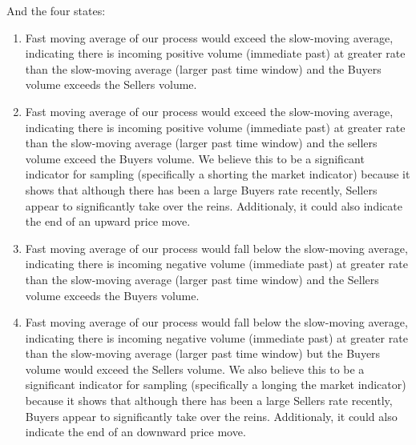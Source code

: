 And the four states:
\begin{enumerate}
\item Fast moving average of our process would exceed the slow-moving average, indicating there is incoming positive volume (immediate past) at greater rate than the slow-moving average (larger past time window) and the Buyers volume exceeds the Sellers volume.
\item Fast moving average of our process would exceed the slow-moving average, indicating there is incoming positive volume (immediate past) at greater rate than the slow-moving average (larger past time window) and the sellers volume exceed the Buyers volume. We believe this to be a significant indicator for sampling (specifically a shorting the market indicator) because it shows that although there has been a large Buyers rate recently, Sellers appear to significantly take over the reins. Additionaly, it could also indicate the end of an upward price move.
\item Fast moving average of our process would fall below the slow-moving average, indicating there is incoming negative volume (immediate past) at greater rate than the slow-moving average (larger past time window) and the Sellers volume exceeds the Buyers volume.
\item Fast moving average of our process would fall below the slow-moving average, indicating there is incoming negative volume (immediate past) at greater rate than the slow-moving average (larger past time window) but the Buyers volume would exceed the Sellers volume. We also believe this to be a significant indicator for sampling (specifically a longing the market indicator) because it shows that although there has been a large Sellers rate recently, Buyers appear to significantly take over the reins. Additionaly, it could also indicate the end of an downward price move.
\end{enumerate}



